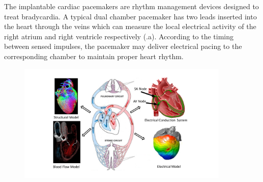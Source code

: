 The implantable cardiac pacemakers are rhythm management devices designed to treat bradycardia. A typical dual chamber pacemaker has two leads inserted into the heart through the veins which can measure the local electrical activity of the right atrium and right ventricle respectively (.a). According to the timing between sensed impulses, the pacemaker may deliver electrical pacing to the corresponding chamber to maintain proper heart rhythm.

\begin{figure}[!t]
\centering
		\includegraphics[width=0.9\textwidth]{figs/models.pdf}
		
\caption{\small }
\label{fig:models}
\end{figure} 
